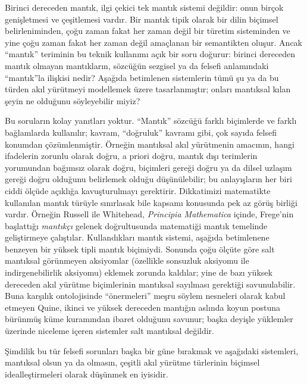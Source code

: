 \documentclass[../../../include/open-logic-section]{subfiles}
\begin{document}


Birinci dereceden mantık, ilgi çekici tek mantık sistemi değildir: onun birçok
genişletmesi ve çeşitlemesi vardır. Bir mantık tipik olarak bir dilin biçimsel
belirleniminden, çoğu zaman fakat her zaman değil bir türetim sisteminden ve
yine çoğu zaman fakat her zaman değil amaçlanan bir semantikten oluşur. Ancak
``mantık'' teriminin bu teknik kullanımı açık bir soru doğurur: birinci
dereceden mantık olmayan mantıkların, sözcüğün sezgisel ya da felsefi
anlamındaki ``mantık''la ilişkisi nedir? Aşağıda betimlenen sistemlerin tümü
şu ya da bu türden akıl yürütmeyi modellemek üzere tasarlanmıştır; onları
mantıksal kılan şeyin ne olduğunu söyleyebilir miyiz?

Bu soruların kolay yanıtları yoktur. ``Mantık'' sözcüğü farklı biçimlerde ve
farklı bağlamlarda kullanılır; kavram, ``doğruluk'' kavramı gibi, çok sayıda
felsefi konumdan çözümlenmiştir. Örneğin mantıksal akıl yürütmenin amacının,
hangi ifadelerin zorunlu olarak doğru, a priori doğru, mantık dışı terimlerin
yorumundan bağımsız olarak doğru, biçimleri gereği doğru ya da dilsel uzlaşım
gereği doğru olduğunu belirlemek olduğu düşünülebilir; bu anlayışların her
biri ciddi ölçüde açıklığa kavuşturulmayı gerektirir. Dikkatimizi matematikte
kullanılan mantık türüyle sınırlasak bile kapsamı konusunda pek az görüş
birliği vardır. Örneğin Russell ile Whitehead, \textit{Principia Mathematica}
içinde, Frege'nin başlattığı {\em mantıkçı} gelenek doğrultusunda matematiği
mantık temelinde geliştirmeye çalıştılar. Kullandıkları mantık sistemi,
aşağıda betimlenene benzeyen bir yüksek tipli mantık biçimiydi. Sonunda çoğu
ölçüte göre salt mantıksal görünmeyen aksiyomlar (özellikle sonsuzluk aksiyomu
ile indirgenebilirlik aksiyomu) eklemek zorunda kaldılar; yine de bazı yüksek
dereceden akıl yürütme biçimlerinin mantıksal sayılması gerektiği savunulabilir.
Buna karşılık ontolojisinde ``önermeleri'' meşru söylem nesneleri olarak kabul
etmeyen Quine, ikinci ve yüksek dereceden mantığın aslında koyun postuna
bürünmüş küme kuramından ibaret olduğunu savunur; başka deyişle yüklemler
üzerinde niceleme içeren sistemler salt mantıksal değildir.

Şimdilik bu tür felsefi sorunları başka bir güne bırakmak ve aşağıdaki
sistemleri, mantıksal olsun ya da olmasın, çeşitli akıl yürütme türlerinin
biçimsel idealleştirmeleri olarak düşünmek en iyisidir.
\end{document}
